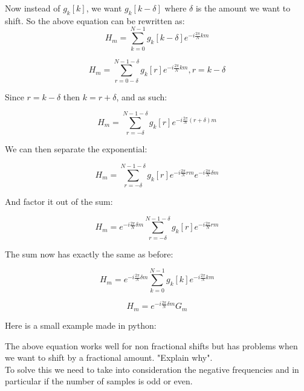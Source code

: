 \documentclass[]{usiinfbachelorproject}
\begin{document}
	Now instead of $g_k[k]$, we want $g_k[k - \delta]$ where $\delta$ is the amount we want to shift.
	So the above equation can be rewritten as:
	\begin{equation*}
		H_m = \displaystyle\sum_{k=0}^{N-1}g_k[k - \delta]e^{-i \frac{2\pi}{N} km}
	\end{equation*}
	
	\begin{equation*}
		H_m = \displaystyle\sum_{r = 0 - \delta}^{N-1-\delta}g_k[r]e^{-i \frac{2\pi}{N} km}, r = k - \delta 
	\end{equation*}
	
	Since $r = k - \delta$ then $ k = r + \delta$, and as such:
	
	\begin{equation*}
		H_m = \displaystyle\sum_{r= -\delta}^{N-1 - \delta}g_k[r]e^{-i \frac{2\pi}{N} (r + \delta)m}
	\end{equation*}
	
	We can then separate the exponential:
	
	\begin{equation*}
		H_m = \displaystyle\sum_{r= -\delta}^{N-1 - \delta}g_k[r]e^{-i \frac{2\pi}{N} rm}e^{-i \frac{2\pi}{N}  \delta m}
	\end{equation*}
	
	And factor it out of the sum:
	
	\begin{equation*}
		H_m = e^{-i \frac{2\pi}{N}  \delta m} \displaystyle\sum_{r= -\delta}^{N-1 - \delta}g_k[r]e^{-i \frac{2\pi}{N} rm}
	\end{equation*}
	
	The sum now has exactly the same as before:
	
	\begin{equation*}
		H_m = e^{-i \frac{2\pi}{N}  \delta m} \displaystyle\sum_{k=0}^{N-1}g_k[k]e^{-i \frac{2\pi}{N} km}
	\end{equation*}
	
	\begin{equation}
		H_m = e^{-i \frac{2\pi}{N}  \delta m} G_m
	\end{equation}
	
	
	Here is a small example made in python:
	
	The above equation works well for non fractional shifts but has problems when we want to shift by a fractional amount.
	"Explain why".\\
	To solve this we need to take into consideration the negative frequencies and in particular if the number of samples is odd or even.
	
\end{document}
